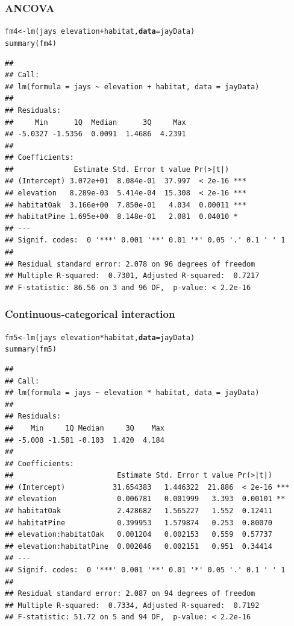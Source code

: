 \documentclass[color=usenames,dvipsnames]{beamer}\usepackage[]{graphicx}\usepackage[]{color}
\makeatletter
\newcommand{\hlopt}[1]{\textcolor[rgb]{0,0,0}{#1}}%
\newcommand{\hlstd}[1]{\textcolor[rgb]{0,0,0}{#1}}%
\newcommand{\hlkwb}[1]{\textcolor[rgb]{0,0.341,0.682}{#1}}%
\newcommand{\hlkwc}[1]{\textcolor[rgb]{0,0,0}{\textbf{#1}}}%
\newcommand{\hlkwd}[1]{\textcolor[rgb]{0.004,0.004,0.506}{#1}}%
\newenvironment{kframe}{%
 \def\at@end@of@kframe{}%
 \ifinner\ifhmode%
  \def\at@end@of@kframe{\end{minipage}}%
  \begin{minipage}{\columnwidth}%
 \fi\fi%
 \def\FrameCommand##1{\hskip\@totalleftmargin \hskip-\fboxsep
 \colorbox{shadecolor}{##1}\hskip-\fboxsep
     \hskip-\linewidth \hskip-\@totalleftmargin \hskip\columnwidth}%
 \MakeFramed {\advance\hsize-\width
   \@totalleftmargin\z@ \linewidth\hsize
   \@setminipage}}%
 {\par\unskip\endMakeFramed%
 \at@end@of@kframe}
\newenvironment{knitrout}{}{} %
\makeatother
\begin{document}
\begin{frame}[fragile]
  \frametitle{ANCOVA}
\begin{knitrout}\scriptsize
{}\color{fgcolor}\begin{kframe}
\begin{alltt}
\hlstd{fm4} \hlkwb{<-} \hlkwd{lm}\hlstd{(jays} \hlopt{~} \hlstd{elevation}\hlopt{+}\hlstd{habitat,} \hlkwc{data}\hlstd{=jayData)}
\hlkwd{summary}\hlstd{(fm4)}
\end{alltt}
\begin{verbatim}
## 
## Call:
## lm(formula = jays ~ elevation + habitat, data = jayData)
## 
## Residuals:
##     Min      1Q  Median      3Q     Max 
## -5.0327 -1.5356  0.0091  1.4686  4.2391 
## 
## Coefficients:
##              Estimate Std. Error t value Pr(>|t|)    
## (Intercept) 3.072e+01  8.084e-01  37.997  < 2e-16 ***
## elevation   8.289e-03  5.414e-04  15.308  < 2e-16 ***
## habitatOak  3.166e+00  7.850e-01   4.034  0.00011 ***
## habitatPine 1.695e+00  8.148e-01   2.081  0.04010 *  
## ---
## Signif. codes:  0 '***' 0.001 '**' 0.01 '*' 0.05 '.' 0.1 ' ' 1
## 
## Residual standard error: 2.078 on 96 degrees of freedom
## Multiple R-squared:  0.7301,	Adjusted R-squared:  0.7217 
## F-statistic: 86.56 on 3 and 96 DF,  p-value: < 2.2e-16
\end{verbatim}
\end{kframe}
\end{knitrout}
\end{frame}


\begin{frame}[fragile]
  \frametitle{Continuous-categorical interaction}
\begin{knitrout}\scriptsize
{}\color{fgcolor}\begin{kframe}
\begin{alltt}
\hlstd{fm5} \hlkwb{<-} \hlkwd{lm}\hlstd{(jays} \hlopt{~} \hlstd{elevation}\hlopt{*}\hlstd{habitat,} \hlkwc{data}\hlstd{=jayData)}
\hlkwd{summary}\hlstd{(fm5)}
\end{alltt}
\begin{verbatim}
## 
## Call:
## lm(formula = jays ~ elevation * habitat, data = jayData)
## 
## Residuals:
##    Min     1Q Median     3Q    Max 
## -5.008 -1.581 -0.103  1.420  4.184 
## 
## Coefficients:
##                        Estimate Std. Error t value Pr(>|t|)    
## (Intercept)           31.654383   1.446322  21.886  < 2e-16 ***
## elevation              0.006781   0.001999   3.393  0.00101 ** 
## habitatOak             2.428682   1.565227   1.552  0.12411    
## habitatPine            0.399953   1.579874   0.253  0.80070    
## elevation:habitatOak   0.001204   0.002153   0.559  0.57737    
## elevation:habitatPine  0.002046   0.002151   0.951  0.34414    
## ---
## Signif. codes:  0 '***' 0.001 '**' 0.01 '*' 0.05 '.' 0.1 ' ' 1
## 
## Residual standard error: 2.087 on 94 degrees of freedom
## Multiple R-squared:  0.7334,	Adjusted R-squared:  0.7192 
## F-statistic: 51.72 on 5 and 94 DF,  p-value: < 2.2e-16
\end{verbatim}
\end{kframe}
\end{knitrout}
\end{frame}
\end{document}
